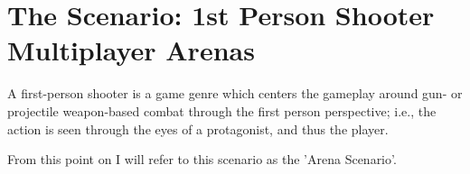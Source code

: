 




% 
%
%
%



% 
%
%
%
%


\section{The Scenario: 1st Person Shooter Multiplayer Arenas}

A first-person shooter is a game genre which centers the gameplay around gun- or projectile weapon-based combat through the first person perspective; i.e., the action is seen through the eyes of a protagonist, and thus the player. 


From this point on I will refer to this scenario as the 'Arena Scenario'.  






